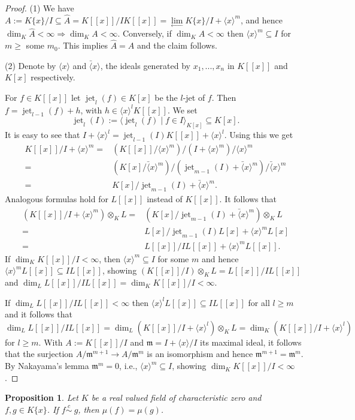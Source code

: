 \documentclass[11pt]{article}
\DeclareMathOperator{\jet}{jet}
\def\x{\langle x \rangle}
\newtheorem{Proposition}[Definition]{Proposition }
\newcommand{\fm}{\mathfrak{m}}
\begin{document}
   \begin{proof}
(1) We have $A:=K\{x\}/I \subseteq \hat A =   K[[x]]/I K[[x]] = \lim\limits_{\longleftarrow} K\{x\}/I+\x^m$,  and hence 
$\dim_K \hat A  < \infty \Longrightarrow \dim_K A < \infty$.
Conversely, if $\dim_K A < \infty$ then $\x^m \subseteq I$ for  $m \ge$ some $m_0$. This implies $\hat A =A$ and the claim follows.

(2) Denote by $\x$ and $\bar \x$,  the ideals generated by $x_1,...,x_n$ in $K[[x]]$ and  $K[x]$ respectively.

For $f \in K[[x]]$ let $\jet_l(f) \in K[x]$ be the $l$-jet of $f$. Then
$f = \jet_{l-1}(f) +h$, with $h \in \x^l K[[x]]$. We set 
$$\jet_l(I):=  \langle\jet_l(f) \mid f \in I \rangle_ {K[x]} \subseteq K[x].$$
It is easy to see that $I + \x^l =\jet_{l-1}(I)K[[x]] + \x^l$. Using this we get
 \begin{align*}
K[[x]]/I+\x^m = & (K[[x]]/\x^m)/(I+\x^m)/\x^m \\
    =& (K[x]/\bar \x^m)/(\jet_{m-1}(I)+\bar\x^m)/\bar\x^m\\
    =& K[x]/ \jet_{m-1}(I) + \bar \x^m.
\end{align*}
Analogous formulas hold for $L[[x]]$ instead of $K[[x]]$. It follows that 
 \begin{align*}
(K[[x]]/I+\x^m)\otimes_K L
  =&(K[x]/ \jet_{m-1}(I) + \bar \x^m)\otimes_K L\\
 =& L[x]/ \jet_{m-1}(I)L[x] +  \x^m L[x]\\
  = & L[[x]]/ IL[[x]] +  \x^m L[[x]]. 
\end{align*}
If  $\dim_K K[[x]]/I <\infty$, then $\x^m \subseteq I$ for some $m$ and hence $\x^m L[[x]] \subseteq I L[[x]]$, showing 
$(K[[x]]/I)\otimes_K L =  L[[x]]/ IL[[x]]$ and
$\dim_L L[[x]]/I L[[x]] = \dim_K K[[x]]/I < \infty $.

If  $\dim_L L[[x]]/IL[[x]] <\infty$ then $\x^l L[[x]] \subseteq IL[[x]]$ for all
$l\ge m$ and it follows that $\dim_L L[[x]]/IL[[x]] = \dim_L (K[[x]]/I+\x^l)\otimes_K L = \dim_K(K[[x]]/I+\x^l)$ for $l\ge m$.
With $A:= K[[x]]/I$ and $\fm = I+\x/I$ its maximal ideal, it follows that
the surjection
$A/\fm^ {m+1} \to A/\fm^ {m}$ is an isomorphism and hence $\fm^ {m+1} = \fm^ {m}$. By Nakayama's lemma $\fm^ {m} =0 $, i.e., 
$\x^m \subseteq I$, showing  $\dim_K K[[x]]/I <\infty$.
 \end{proof}

  \begin{Proposition}\label{prop:lefschetz1}
     Let $K$ be a real valued field of characteristic zero
     and $f,g\in K\{x\}$. 
     If $ f \overset{c}{\sim}\ g$, then $\mu(f)=\mu(g)$.
   \end{Proposition}
   
\end{document}
